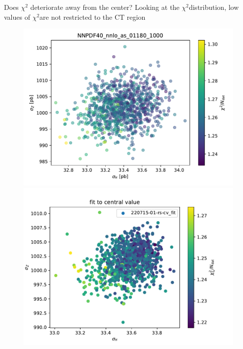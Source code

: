 \documentclass[aspectratio=169,10pt]{beamer}
\newcommand{\chitwo}{$\chi^2$}
\begin{document}
\begin{frame}[t]{Does $\chi^2$ deteriorate away from the center?}
  Looking at the \chitwo distribution, low values of \chitwo are not restricted to the CT region
  \begin{figure}
    \centering
    \includegraphics[height=.55\textheight]{nnpdf40_chi2_scatter.pdf}
    \includegraphics[height=.55\textheight]{chi2_fit_to_central_value.pdf}
  \end{figure}
\end{frame}
\end{document}
